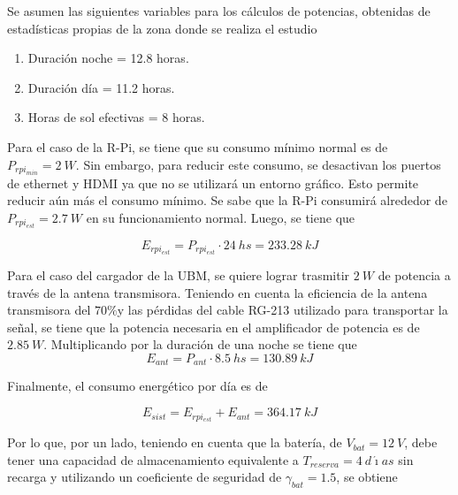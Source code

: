 
Se asumen las siguientes variables para los cálculos de potencias, obtenidas de estadísticas propias de la zona donde se realiza el estudio \cite{ref:weather_bariloche}
\begin{enumerate}
	\item Duración noche = 12.8 horas.
	\item Duración día = 11.2 horas.
	\item Horas de sol efectivas = 8 horas.
\end{enumerate}

Para el caso de la R-Pi, se tiene que su consumo mínimo normal es de $P_{rpi_{min}} = 2 \ W$. Sin embargo, para reducir este consumo, se desactivan los puertos de ethernet y HDMI ya que no se utilizará un entorno gráfico. Esto permite reducir aún más el consumo mínimo. Se sabe que la R-Pi consumirá alrededor de $P_{rpi_{est}} = 2.7 \ W$ en su funcionamiento normal.
Luego, se tiene que

\begin{equation}
E_{rpi_{est}} = P_{rpi_{est}}\cdot 24 \ hs = 233.28 \ kJ
\end{equation}


Para el caso del cargador de la UBM, se quiere lograr trasmitir $2 \ W$ de potencia a través de la antena transmisora. Teniendo en cuenta la eficiencia de la antena transmisora del $70\%$y las pérdidas del cable RG-213 utilizado para transportar la señal, se tiene que la potencia necesaria en el amplificador de potencia es de $2.85 \ W$. Multiplicando por la duración de una noche se tiene que
\begin{equation}
E_{ant} = P_{ant}\cdot 8.5 \ hs = 130.89 \ kJ
\end{equation}

Finalmente, el consumo energético por día es de

\begin{equation}
E_{sist} = E_{rpi_{est}} + E_{ant} = 364.17 \ kJ
\end{equation}

Por lo que, por un lado, teniendo en cuenta que la batería, de $V_{bat} = 12 \ V$, debe tener una capacidad de almacenamiento equivalente a $T_{reserva} = 4 \ d\acute{\imath}as$ sin recarga \cite{ref:weather_bariloche} y utilizando un coeficiente de seguridad de $\gamma_{bat} = 1.5$, se obtiene

